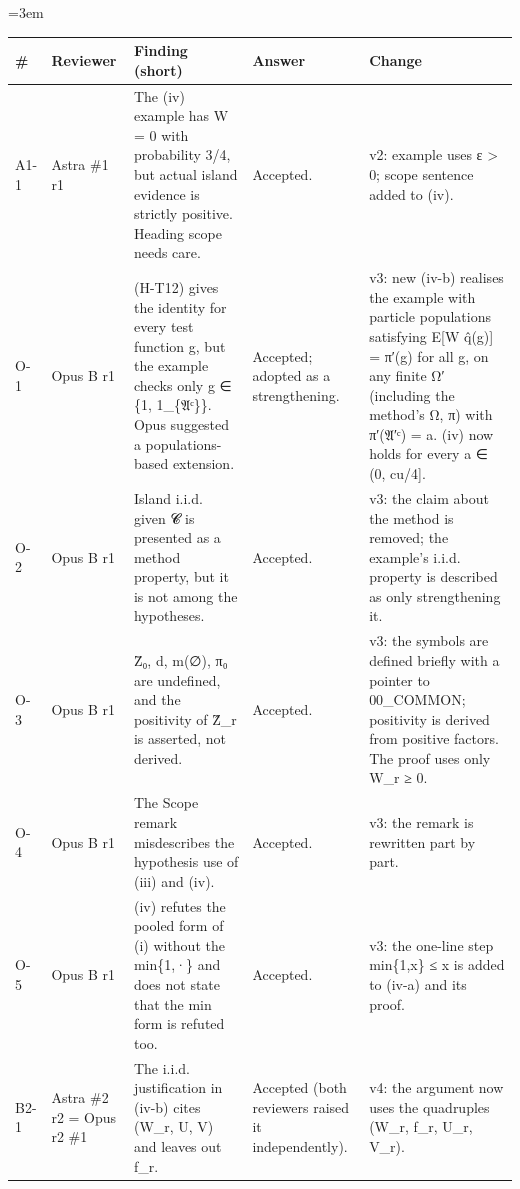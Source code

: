\documentclass[11pt]{report}
\newenvironment{mdblock}{\begingroup\mdfont\raggedright\setlength{\parindent}{0pt}\setlength{\parskip}{0.55em}\emergencystretch=3em}{\par\endgroup}
\begin{document}
\begin{mdblock}
{\small
\begin{longtable}{|>{\raggedright\arraybackslash}p{}|>{\raggedright\arraybackslash}p{}|>{\raggedright\arraybackslash}p{}|>{\raggedright\arraybackslash}p{}|>{\raggedright\arraybackslash}p{}|}
\hline
\textbf{\#} & \textbf{Reviewer} & \textbf{Finding (short)} & \textbf{Answer} & \textbf{Change} \\ \hline\endhead
A1-1 & Astra \#1 r1 & The (iv) example has W = 0 with probability 3/4, but actual island evidence is strictly positive. Heading scope needs care. & Accepted. & v2: example uses ε > 0; scope sentence added to (iv). \\ \hline
O-1 & Opus B r1 & (H-T12) gives the identity for every test function g, but the example checks only g ∈ \{1, 1\_\{𝔄ᶜ\}\}. Opus suggested a populations-based extension. & Accepted; adopted as a strengthening. & v3: new (iv-b) realises the example with particle populations satisfying E[W q̂(g)] = π′(g) for all g, on any finite Ω′ (including the method's Ω, π) with π′(𝔄′ᶜ) = a. (iv) now holds for every a ∈ (0, cu/4]. \\ \hline
O-2 & Opus B r1 & Island i.i.d. given 𝓒 is presented as a method property, but it is not among the hypotheses. & Accepted. & v3: the claim about the method is removed; the example's i.i.d. property is described as only strengthening it. \\ \hline
O-3 & Opus B r1 & Z̄₀, d, m(∅), π₀ are undefined, and the positivity of Ẑ\_r is asserted, not derived. & Accepted. & v3: the symbols are defined briefly with a pointer to 00\_COMMON; positivity is derived from positive factors. The proof uses only W\_r ≥ 0. \\ \hline
O-4 & Opus B r1 & The Scope remark misdescribes the hypothesis use of (iii) and (iv). & Accepted. & v3: the remark is rewritten part by part. \\ \hline
O-5 & Opus B r1 & (iv) refutes the pooled form of (i) without the min\{1,·\} and does not state that the min form is refuted too. & Accepted. & v3: the one-line step min\{1,x\} ≤ x is added to (iv-a) and its proof. \\ \hline
B2-1 & Astra \#2 r2 = Opus r2 \#1 & The i.i.d. justification in (iv-b) cites (W\_r, U, V) and leaves out f\_r. & Accepted (both reviewers raised it independently). & v4: the argument now uses the quadruples (W\_r, f\_r, U\_r, V\_r). \\ \hline

\end{longtable}}
\end{mdblock}
\end{document}
